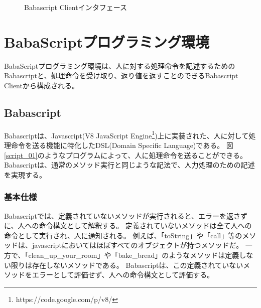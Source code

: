 \documentclass[twoside]{wiss}
\begin{document}
\begin{figure}[!h]  
  \centering
  \caption{Babascript Clientインタフェース}
  \label{webapp-interface}
\end{figure}

\section{BabaScriptプログラミング環境}
BabaScriptプログラミング環境は、人に対する処理命令を記述するためのBabascriptと、処理命令を受け取り、返り値を返すことのできるBabascript Clientから構成される。  

\subsection{Babascript}

Babascriptは、Javascript(V8 JavaScript Engine\footnote{https://code.google.com/p/v8/})上に実装された、人に対して処理命令を送る機能に特化したDSL(Domain Specific Language)である。
図\ref{script_01}のようなプログラムによって、人に処理命令を送ることができる。
Babascriptは、通常のメソッド実行と同じような記法で、人力処理のための記述を実現する。

\subsubsection{基本仕様}

Babascriptでは、定義されていないメソッドが実行されると、エラーを返さずに、人への命令構文として解釈する。
定義されていないメソッドは全て人への命令として実行され、人に通知される。
例えば、「toString」や「call」等のメソッドは、javascriptにおいてはほぼすべてのオブジェクトが持つメソッドだ。
一方で、「clean\_up\_your\_room」や「bake\_bread」のようなメソッドは定義しない限りは存在しないメソッドである。
Babascriptは、この定義されていないメソッドをエラーとして評価せず、人への命令構文として評価する。
\end{document}
